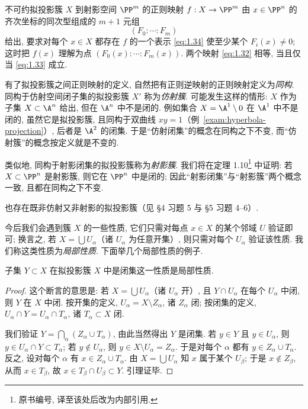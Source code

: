 \begin{definition}[正则映射的第二种形式]\label{def:regular-map-forms}
	不可约拟投影簇 $X$ 到射影空间 $\PP^m$ 的正则映射 $f: X \to \PP^m$ 由 $x \in \PP^n$ 的齐次坐标的同次型组成的 $m+1$ 元组
	\begin{equation}
		\label{eq:1.34}
		(F_0 : \cdots : F_m)
	\end{equation}
	给出, 要求对每个 $x \in X$ 都存在 $f$ 的一个表示 \eqref{eq:1.34} 使至少某个 $F_i(x) \ne 0$; 这时把 $f(x)$ 理解为点 $(F_0(x) : \cdots : F_m(x))$. 两个映射 \eqref{eq:1.32} 相等, 当且仅当 \eqref{eq:1.33} 成立.
\end{definition}

有了拟投影簇之间正则映射的定义, 自然把有正则逆映射的正则映射定义为\emph{同构}. 同构于仿射空间闭子集的拟投影簇 $X'$ 称为\emph{仿射簇}. 可能发生这样的情形: $X$ 作为子集 $X \subset \A^n$ 给出, 但在 $\A^n$ 中不是闭的. 例如集合 $X = \A^1 \setminus 0$ 在 $\A^1$ 中不是闭的, 虽然它是拟投影簇, 且同构于双曲线 $xy = 1$（例~\ref{exam:hyperbola-projection}）, 后者是 $\A^2$ 的闭集. 于是``仿射闭集''的概念在同构之下不变, 而``仿射簇''的概念按定义就是不变的.

类似地, 同构于射影闭集的拟投影簇称为\emph{射影簇}. 我们将在定理 1.10\footnote{原书编号, 译至该处后改为内部引用.} 中证明: 若 $X \subset \PP^n$ 是射影簇, 则它在 $\PP^n$ 中是闭的; 因此``射影闭集''与``射影簇''两个概念一致, 且都在同构之下不变.

也存在既非仿射又非射影的拟投影簇（见 §4 习题 5 与 §5 习题 4--6）.

今后我们会遇到簇 $X$ 的一些性质, 它们只需对每点 $x \in X$ 的某个邻域 $U$ 验证即可; 换言之, 若 $X = \bigcup U_\alpha$（诸 $U_\alpha$ 为任意开集）, 则只需对每个 $U_\alpha$ 验证该性质. 我们称这类性质为\emph{局部性质}. 下面举几个局部性质的例子.

\begin{lemma}\label{lem:closed-local}
	子集 $Y \subset X$ 在拟投影簇 $X$ 中是闭集这一性质是局部性质.
\end{lemma}

\begin{proof}
	这个断言的意思是: 若 $X = \bigcup U_\alpha$（诸 $U_\alpha$ 开）, 且 $Y \cap U_\alpha$ 在每个 $U_\alpha$ 中闭, 则 $Y$ 在 $X$ 中闭. 按开集的定义, $U_\alpha = X \setminus Z_\alpha$, 诸 $Z_\alpha$ 闭; 按闭集的定义, $U_\alpha \cap Y = U_\alpha \cap T_\alpha$, 诸 $T_\alpha \subset X$ 闭.

	我们验证 $Y = \bigcap_\alpha (Z_\alpha \cup T_\alpha)$, 由此当然得出 $Y$ 是闭集. 若 $y \in Y$ 且 $y \in U_\alpha$, 则 $y \in U_\alpha \cap Y \subset T_\alpha$; 若 $y \notin U_\alpha$, 则 $y \in X \setminus U_\alpha = Z_\alpha$. 于是对每个 $\alpha$ 都有 $y \in Z_\alpha \cup T_\alpha$. 反之, 设对每个 $\alpha$ 有 $x \in Z_\alpha \cup T_\alpha$. 由 $X = \bigcup U_\alpha$ 知 $x$ 属于某个 $U_\beta$; 于是 $x \notin Z_\beta$, 从而 $x \in T_\beta$, 故 $x \in T_\beta \cap U_\beta \subset Y$. 引理证毕.
\end{proof}

